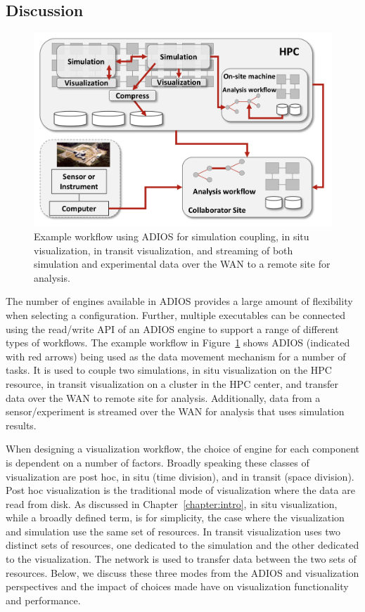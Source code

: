 \documentclass[x11names,table,xcdraw,graybox]{svmult}
\begin{document}
\subsection{Discussion}
\label{sec:adios:discussion}

\begin{figure}[t]
\sidecaption
\includegraphics[width=1\linewidth]{figures/ADIOS_workflow.png}
\caption{Example workflow using ADIOS for simulation coupling, in situ visualization, in transit visualization, and streaming of both simulation and experimental data over the WAN to a remote site for analysis.}
\label{ch10:fig:example_workflow}
\end{figure}

The number of engines available in ADIOS provides a large amount of flexibility when selecting a configuration. Further, multiple executables can be connected using the read/write API of an ADIOS engine to support a range of different types of workflows. The example workflow in Figure~\ref{ch10:fig:example_workflow} shows ADIOS (indicated with red arrows) being used as the data movement mechanism for a number of tasks. It is used to couple two simulations, in situ visualization on the HPC resource, in transit visualization on a cluster in the HPC center, and transfer data over the WAN to remote site for analysis. Additionally, data from a sensor/experiment is streamed over the WAN for analysis that uses simulation results.

When designing a visualization workflow, the choice of engine for each component is dependent on a number of factors. Broadly speaking these classes of visualization are post hoc, in situ (time division), and in transit (space division). Post hoc visualization is the traditional mode of visualization where the data are read from disk. As discussed in Chapter~\ref{chapter:intro}, in situ visualization, while a broadly defined term, is for simplicity, the case where the visualization and simulation use the same set of resources. In transit visualization uses two distinct sets of resources, one dedicated to the simulation and the other dedicated to the visualization. The network is used to transfer data between the two sets of resources. Below, we discuss these three modes from the ADIOS and visualization perspectives and the impact of choices made have on visualization functionality and performance.
\end{document}
